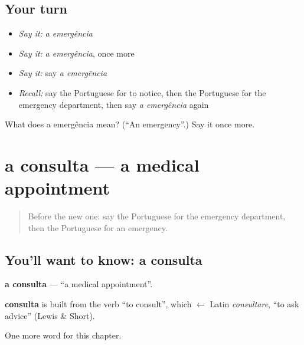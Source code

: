 \subsection*{Your turn}
\begin{itemize}
\raggedright
  \item \emph{Say it:} \emph{a emergência}
  \item \emph{Say it:} \emph{a emergência}, once more
  \item \emph{Say it:} say \emph{a emergência}
  \item \emph{Recall:} say the Portuguese for to notice, then the Portuguese for the emergency department, then say \emph{a emergência} again
\end{itemize}

\begin{tcolorbox}[breakable,colback=teal!4,colframe=teal!35!black,title={Before you move on}]
What does a emergência mean? (\textquotedblleft{}An emergency\textquotedblright{}.) Say it once more.
\end{tcolorbox}
\section[a consulta]{a consulta — a medical appointment}

\label{lesson:PT-C240-consulta}



\begin{quote}
Before the new one: say the Portuguese for the emergency department, then the Portuguese for an emergency.
\end{quote}

\subsection*{You'll want to know: a consulta}
\textbf{a consulta} — \textquotedblleft{}a medical appointment\textquotedblright{}.

\begin{cousinweb}
\textbf{consulta} is built from the verb \textquotedblleft{}to consult\textquotedblright{}, which $\leftarrow$ Latin \emph{consultare}, \textquotedblleft{}to ask advice\textquotedblright{} (Lewis \& Short).
\end{cousinweb}

\begin{grammarlens}[title={What you've built}]
One more word for this chapter.
\end{grammarlens}

